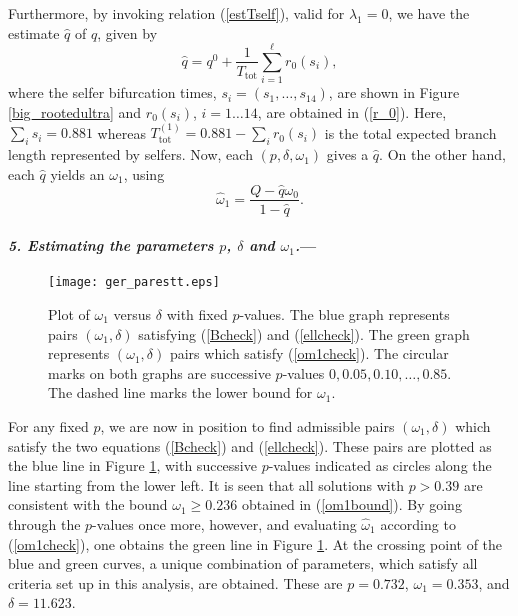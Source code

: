 \documentclass[a4paper,11pt]{article}
\theoremstyle{plain}
\theoremstyle{definition}
\numberwithin{equation}{section}
\begin{document}
Furthermore, by invoking relation
(\ref{estTself}), valid for $\lambda_1=0$, we have the estimate $\hat
q$ of $q$, given by 
\begin{equation}\nonumber
\hat q=q^0+\frac{1}{T_\mathrm{tot}}\sum_{i=1}^\ell r_0{(s_i)},
\end{equation} 
where the selfer bifurcation times, $s_i=(s_1,\dots,s_{14})$, are shown in
Figure \ref{big_rootedultra} and $r_0{(s_i)}$, $i=1\dots14$, are obtained in (\ref{r_0}). Here, $\sum_i s_i=0.881$
whereas $T^{(1)}_\mathrm{tot}=0.881-\sum_i r_0{(s_i)}$ is the total expected branch length
represented by selfers. Now, each $(p,\delta,\omega_1)$ gives a
$\hat q$. On the other hand, each $\hat q$ yields an $\omega_1$, using 
\begin{equation}\label{om1check}
\hat \omega_1=\frac{Q-\hat q \omega_0}{1-\hat q}.
\end{equation}



\paragraph{\textit{5. Estimating the parameters $p$, $\delta$ and $\omega_1$.}---}

\begin{figure}[!t]
\centerline{\texttt{[image: ger\_parestt.eps]}}
\caption{Plot of $\omega_1$ versus $\delta$ with fixed $p$-values. The blue 
graph represents pairs $(\omega_1,\delta)$ satisfying (\ref{Bcheck}) and
(\ref{ellcheck}). The green graph represents $(\omega_1,\delta)$ pairs which satisfy 
(\ref{om1check}). The circular marks on both graphs are successive $p$-values $0,
0.05,0.10,\dots,0.85$. The dashed line marks the lower bound for $\omega_1$. }
\label{fig:gerparest}
\end{figure}





For any fixed $p$, we are now in position to find admissible pairs
$(\omega_1,\delta)$ which satisfy the two equations (\ref{Bcheck}) and
(\ref{ellcheck}). These pairs are plotted as the blue line in Figure
\ref{fig:gerparest}, with successive $p$-values indicated as circles along the line starting
from the lower left. It is seen that all solutions with $p> 0.39$
are consistent with the bound $\omega_1\ge 0.236$ obtained in
(\ref{om1bound}).  By going through the $p$-values once more, however,
and evaluating $\hat\omega_1$ according to (\ref{om1check}), one
obtains the green line in Figure \ref{fig:gerparest}. At the
crossing point of the blue and green curves, a unique combination 
of parameters, which satisfy all criteria set up in this analysis, are obtained. 
These are $p=0.732$, $\omega_1=0.353$, and $\delta=11.623$.
\end{document}

